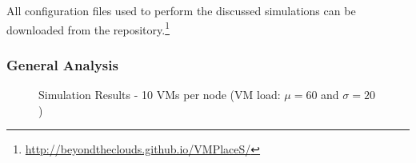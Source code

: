 All configuration files used to perform the discussed simulations can
be downloaded from the \vmps repository.\footnote{\url{http://beyondtheclouds.github.io/VMPlaceS/}}

\subsubsection{General  Analysis}
\label{subsec:general-comparison}

\begin{figure}[bp]
\subcapcentertrue
{}
\caption{Simulation Results - 10 VMs per node (VM load: $\mu=60$ and $\sigma=20$)}
\label{fig:simulation-overview}
\end{figure}



